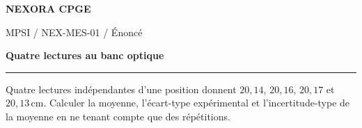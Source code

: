 \documentclass[11pt,a4paper]{article}
\begin{document}
{\small\bfseries\color{nexorablue} NEXORA CPGE}\par
{\small MPSI / NEX-MES-01 / Énoncé}\par
{\LARGE\bfseries Quatre lectures au banc optique}\par
\vspace{0.25em}\hrule\vspace{0.6em}

Quatre lectures indépendantes d’une position donnent $20{,}14$, $20{,}16$, $20{,}17$ et $20{,}13\,\mathrm{cm}$. Calculer la moyenne, l’écart-type expérimental et l’incertitude-type de la moyenne en ne tenant compte que des répétitions.
\end{document}
